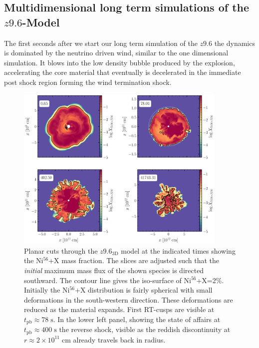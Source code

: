 \documentclass[fleqn,usenatbib]{mnras}
\newcommand{\nickel}{$\mathrm{Ni^{56}}$\xspace}
\newcommand{\tracer}{$\mathrm{X}$\xspace}
\begin{document}
\subsection{Multidimensional long term simulations of the $z9.6$-Model}
\label{subsec:muldidimensional longterm z9}
The first seconds after we start our long term simulation of the $z9.6$ the dynamics is dominated by the neutrino driven wind, similar to the one dimensional simulation. It blows into the low density bubble produced by the explosion, accelerating the core material that eventually is decelerated in the immediate post shock region forming the wind termination shock. 

\iffalse
\begin{figure}
 \centering
 \includegraphics[width=0.9\textwidth]{pic/species_cuts_z9_3d_4times.pdf}
 \caption{Planar cuts through the $z9.6_{\mathrm{3D}}$ model at the indicated times showing the \nickel+\tracer mass fraction. The slices are adjusted such that the \textit{initial} maximum mass flux of the shown species is directed southward. The contour line gives the iso-surface of \nickel+\tracer=2\%. Initially the \nickel+\tracer distribution is fairly spherical with small deformations in the south-western direction. These deformations are reduced as the material expands. First RT-cusps are visible at $t_{\mathrm{pb}}\approx 78\;\mathrm{s}$. In the lower left panel, showing the state of affairs at  $t_{\mathrm{pb}}\approx 400\;\mathrm{s}$ the reverse shock, visible as the reddish discontinuity at $r\approx 2\times 10^{11}\;\mathrm{cm}$ already travels back in radius. }
 \label{fig:z9_3d_species_4times}
\end{figure}
\end{document}

